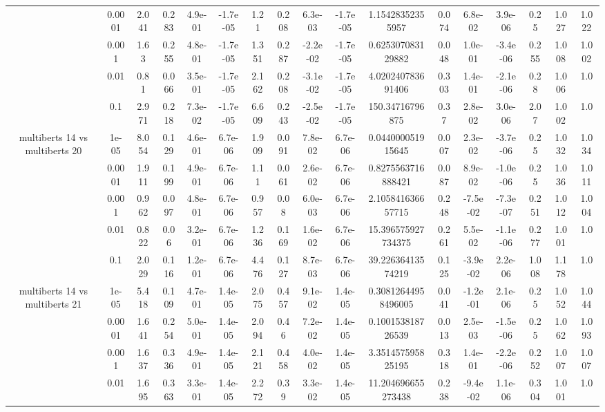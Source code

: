 \begin{tabular}{|c|c|c|c|c|c|c|c|c|c|c|c|c|c|c|c|c|}
 & 0.0001 & 2.041 & 0.283 & 4.9e-01 & -1.7e-05 & 1.21 & 0.208 & 6.3e-03 & -1.7e-05 & 1.15428352355957 & 0.074 & 6.8e-02 & 3.9e-06 & 0.25 & 1.027 & 1.022 \\
 & 0.001 & 1.63 & 0.255 & 4.8e-01 & -1.7e-05 & 1.351 & 0.287 & -2.2e-02 & -1.7e-05 & 0.625307083129882 & 0.048 & 1.0e-01 & -3.4e-06 & 0.255 & 1.008 & 1.002 \\
 & 0.01 & 0.81 & 0.066 & 3.5e-01 & -1.7e-05 & 2.162 & 0.208 & -3.1e-02 & -1.7e-05 & 4.020240783691406 & 0.303 & 1.4e-01 & -2.1e-06 & 0.28 & 1.006 & 1.0 \\
 & 0.1 & 2.971 & 0.218 & 7.3e-02 & -1.7e-05 & 6.609 & 0.243 & -2.5e-02 & -1.7e-05 & 150.34716796875 & 0.37 & 2.8e-02 & 3.0e-06 & 2.07 & 1.002 & 1.0 \\
\hline
\multirow{5}{*}{multiberts 14 vs multiberts 20} & 1e-05 & 8.054 & 0.129 & 4.6e-01 & 6.7e-06 & 1.909 & 0.091 & 7.8e-02 & 6.7e-06 & 0.044000051915645 & 0.007 & 2.3e-02 & -3.7e-06 & 0.25 & 1.032 & 1.034 \\
 & 0.0001 & 1.911 & 0.199 & 4.9e-01 & 6.7e-06 & 1.11 & 0.061 & 2.6e-02 & 6.7e-06 & 0.8275563716888421 & 0.087 & 8.9e-02 & -1.0e-06 & 0.25 & 1.036 & 1.011 \\
 & 0.001 & 0.962 & 0.097 & 4.8e-01 & 6.7e-06 & 0.957 & 0.08 & 6.0e-03 & 6.7e-06 & 2.105841636657715 & 0.248 & -7.5e-02 & -7.3e-07 & 0.251 & 1.012 & 1.004 \\
 & 0.01 & 0.822 & 0.06 & 3.2e-01 & 6.7e-06 & 1.236 & 0.169 & 1.6e-02 & 6.7e-06 & 15.396575927734375 & 0.261 & 5.5e-02 & -1.1e-06 & 0.277 & 1.001 & 1.0 \\
 & 0.1 & 2.029 & 0.116 & 1.2e-01 & 6.7e-06 & 4.476 & 0.127 & 8.7e-03 & 6.7e-06 & 39.22636413574219 & 0.125 & -3.9e-02 & 2.2e-06 & 1.008 & 1.178 & 1.0 \\
\hline
\multirow{5}{*}{multiberts 14 vs multiberts 21} & 1e-05 & 5.418 & 0.109 & 4.7e-01 & 1.4e-05 & 2.075 & 0.457 & 9.1e-02 & 1.4e-05 & 0.30812644958496005 & 0.041 & -1.2e-01 & 2.1e-06 & 0.25 & 1.052 & 1.044 \\
 & 0.0001 & 1.641 & 0.254 & 5.0e-01 & 1.4e-05 & 2.094 & 0.46 & 7.2e-02 & 1.4e-05 & 0.100153818726539 & 0.013 & 2.5e-03 & -1.5e-06 & 0.25 & 1.062 & 1.093 \\
 & 0.001 & 1.637 & 0.336 & 4.9e-01 & 1.4e-05 & 2.121 & 0.458 & 4.0e-02 & 1.4e-05 & 3.351457595825195 & 0.318 & 1.4e-01 & -2.2e-06 & 0.252 & 1.007 & 1.007 \\
 & 0.01 & 1.695 & 0.363 & 3.3e-01 & 1.4e-05 & 2.272 & 0.39 & 3.3e-02 & 1.4e-05 & 11.204696655273438 & 0.238 & -9.4e-02 & 1.1e-06 & 0.304 & 1.001 & 1.0 \\

\end{tabular}
